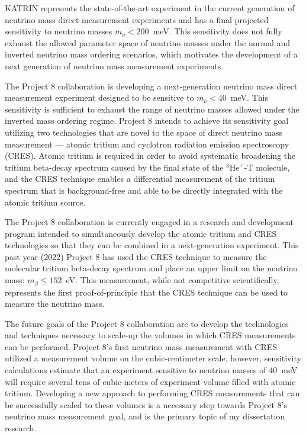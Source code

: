 KATRIN represents the state-of-the-art experiment in the current generation of neutrino mass direct measurement experiments and has a final projected sensitivity to neutrino masses $m_\nu < 200$~meV. This sensitivity does not fully exhaust the allowed parameter space of neutrino masses under the normal and inverted neutrino mass ordering scenarios, which motivates the development of a next generation of neutrino mass measurement experiments. 

The Project 8 collaboration is developing a next-generation neutrino mass direct measurement experiment designed to be sensitive to $m_\nu<40$~meV. This sensitivity is sufficient to exhaust the range of neutrino masses allowed under the inverted mass ordering regime. Project 8 intends to achieve its sensitivity goal utilizing two technologies that are novel to the space of direct neutrino mass measurement --- atomic tritium and cyclotron radiation emission spectroscopy (CRES). Atomic tritium is required in order to avoid systematic broadening the tritium beta-decay spectrum caused by the final state of the $^3\textrm{He}^+$-T molecule, and the CRES technique enables a differential measurement of the tritium spectrum that is background-free and able to be directly integrated with the atomic tritium source.

The Project 8 collaboration is currently engaged in a research and development program intended to simultaneously develop the atomic tritium and CRES technologies so that they can be combined in a next-generation experiment. This past year (2022) Project 8 has used the CRES technique to measure the molecular tritium beta-decay spectrum and place an upper limit on the neutrino mass: $m_\beta\leq152$~eV. This measurement, while not competitive scientifically, represents the first proof-of-principle that the CRES technique can be used to measure the neutrino mass.

The future goals of the Project 8 collaboration are to develop the technologies and techniques necessary to scale-up the volumes in which CRES measurements can be performed. Project 8's first neutrino mass measurement with CRES utilized a measurement volume on the cubic-centimeter scale, however, sensitivity calculations estimate that an experiment sensitive to neutrino masses of 40~meV will require several tens of cubic-meters of experiment volume filled with atomic tritium. Developing a new approach to performing CRES measurements that can be successfully scaled to these volumes is a necessary step towards Project 8's neutrino mass measurement goal, and is the primary topic of my dissertation research.


